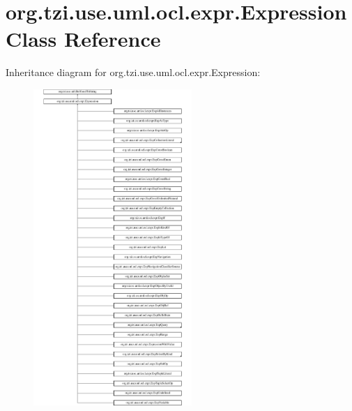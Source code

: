 \hypertarget{classorg_1_1tzi_1_1use_1_1uml_1_1ocl_1_1expr_1_1_expression}{\section{org.\-tzi.\-use.\-uml.\-ocl.\-expr.\-Expression Class Reference}
\label{classorg_1_1tzi_1_1use_1_1uml_1_1ocl_1_1expr_1_1_expression}
}
Inheritance diagram for org.\-tzi.\-use.\-uml.\-ocl.\-expr.\-Expression\-:\begin{figure}[H]
\begin{center}
\leavevmode
\includegraphics[height=12.000000cm]{classorg_1_1tzi_1_1use_1_1uml_1_1ocl_1_1expr_1_1_expression}
\end{center}
\end{figure}
